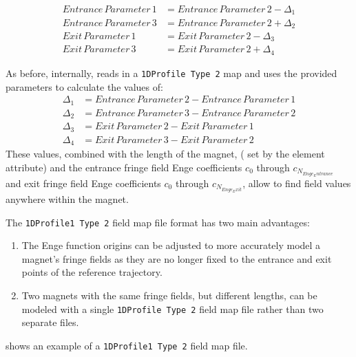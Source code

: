 \begin{align*}
  Entrance\,Parameter\,1 &= Entrance\,Parameter\,2 - \Delta_{1} \\
  Entrance\,Parameter\,3 &= Entrance\,Parameter\,2 + \Delta_{2} \\
  Exit\,Parameter\,1 &= Exit\,Parameter\,2 - \Delta_{3} \\
  Exit\,Parameter\,3 &= Exit\,Parameter\,2 + \Delta_{4}
\end{align*}

As before, internally, \opal reads in a \texttt{1DProfile Type 2} map and uses the provided parameters to calculate the values of:
\begin{align*}
\Delta_{1} &= Entrance\,Parameter\,2 - Entrance\,Parameter\,1 \\
\Delta_{2} &= Entrance\,Parameter\,3 - Entrance\,Parameter\,2 \\
\Delta_{3} &= Exit\,Parameter\,2 - Exit\,Parameter\,1 \\
\Delta_{4} &= Exit\,Parameter\,3 - Exit\,Parameter\,2
\end{align*}
These values, combined with the length of the magnet,  ( set by the element attribute) and the entrance fringe field Enge coefficients $c_0$ through $c_{N_{Enge_Entrance}}$ and exit fringe field Enge coefficients $c_0$ through $c_{N_{Enge_Exit}}$, allow \opal to find field values anywhere within the magnet.

The \texttt{1DProfile1 Type 2} field map file format has two main advantages:

\begin{enumerate}
\item The Enge function origins can be adjusted to more accurately model a magnet's fringe fields as they are no longer fixed to the entrance and exit points of the reference trajectory.
\item Two magnets with the same fringe fields, but different lengths, can be modeled with a single
  \texttt{1DProfile Type 2} field map file rather than two separate files.
\end{enumerate}
 shows an example of a \texttt{1DProfile1 Type 2} field map file.

